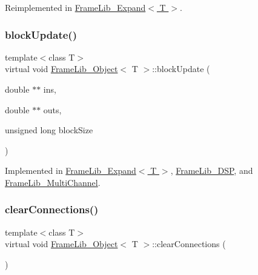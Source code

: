 Reimplemented in \hyperlink{class_frame_lib___expand_a94ab97ff114452551719fad428fd2d6e}{Frame\+Lib\+\_\+\+Expand$<$ T $>$}.

\mbox{\label{class_frame_lib___object_a6efd81ab386e62400960471fa3cc94e7}} 
\subsubsection{\texorpdfstring{block\+Update()}{blockUpdate()}}
{\footnotesize\ttfamily template$<$class T$>$ \\
virtual void \hyperlink{class_frame_lib___object}{Frame\+Lib\+\_\+\+Object}$<$ T $>$\+::block\+Update (\begin{DoxyParamCaption}\item[{double $\ast$$\ast$}]{ins,  }\item[{double $\ast$$\ast$}]{outs,  }\item[{unsigned long}]{block\+Size }\end{DoxyParamCaption})\hspace{0.3cm}{\ttfamily [pure virtual]}}



Implemented in \hyperlink{class_frame_lib___expand_ae712d631cb99284e91c3f318534b3c03}{Frame\+Lib\+\_\+\+Expand$<$ T $>$}, \hyperlink{class_frame_lib___d_s_p_aafa57c93417ced3d5610ca9f6b0f0913}{Frame\+Lib\+\_\+\+D\+SP}, and \hyperlink{class_frame_lib___multi_channel_a8ad8f1c0138f32ef0bfb7e4673b34d30}{Frame\+Lib\+\_\+\+Multi\+Channel}.

\mbox{\label{class_frame_lib___object_a5b219c0cb96a7b6b1f0c471f665337ec}} 
\subsubsection{\texorpdfstring{clear\+Connections()}{clearConnections()}}
{\footnotesize\ttfamily template$<$class T$>$ \\
virtual void \hyperlink{class_frame_lib___object}{Frame\+Lib\+\_\+\+Object}$<$ T $>$\+::clear\+Connections (\begin{DoxyParamCaption}{ }\end{DoxyParamCaption})\hspace{0.3cm}{\ttfamily [pure virtual]}}



